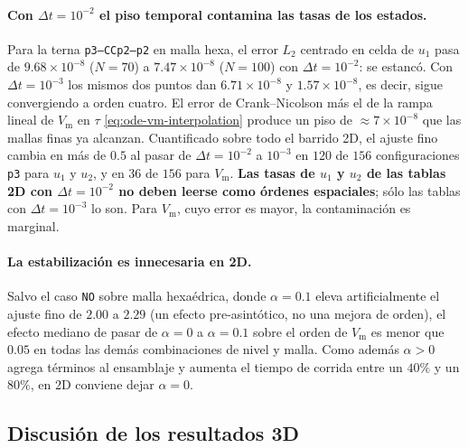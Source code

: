 \documentclass[11pt,a4paper]{article}
\newcommand{\code}[1]{\texttt{\small #1}}
\newcommand{\Vm}{V_{\text{m}}}
\begin{document}
\paragraph{Con $\Delta t=10^{-2}$ el piso temporal contamina las tasas de los estados.}
Para la terna \code{p3--CCp2--p2} en malla hexa, el error $L_2$ centrado en celda de $u_1$ pasa
de $9.68\times10^{-8}$ ($N=70$) a $7.47\times10^{-8}$ ($N=100$) con $\Delta t=10^{-2}$: se
estancó. Con $\Delta t=10^{-3}$ los mismos dos puntos dan $6.71\times10^{-8}$ y
$1.57\times10^{-8}$, es decir, sigue convergiendo a orden cuatro. El error de Crank--Nicolson
más el de la rampa lineal de $\Vm$ en $\tau$ \eqref{eq:ode-vm-interpolation} produce un piso de
$\approx7\times10^{-8}$ que las mallas finas ya alcanzan. Cuantificado sobre todo el barrido
2D, el ajuste fino cambia en más de $0.5$ al pasar de $\Delta t=10^{-2}$ a $10^{-3}$ en
$120$ de $156$ configuraciones \code{p3} para $u_1$ y $u_2$, y en $36$ de $156$ para $\Vm$.
\textbf{Las tasas de $u_1$ y $u_2$ de las tablas 2D con $\Delta t=10^{-2}$ no deben leerse como
órdenes espaciales}; sólo las tablas con $\Delta t=10^{-3}$ lo son. Para $\Vm$, cuyo error es
mayor, la contaminación es marginal.

\paragraph{La estabilización es innecesaria en 2D.}
Salvo el caso \code{NO} sobre malla hexaédrica, donde $\alpha=0.1$ eleva artificialmente el
ajuste fino de $2.00$ a $2.29$ (un efecto pre-asintótico, no una mejora de orden), el efecto
mediano de pasar de $\alpha=0$ a $\alpha=0.1$ sobre el orden de $\Vm$ es menor que $0.05$ en
todas las demás combinaciones de nivel y malla. Como además $\alpha>0$ agrega términos al
ensamblaje y aumenta el tiempo de corrida entre un $40\%$ y un $80\%$, en 2D conviene dejar
$\alpha=0$.



\FloatBarrier

\subsection{Discusión de los resultados 3D}
\label{sec:es-conclusiones-3d}
\end{document}
